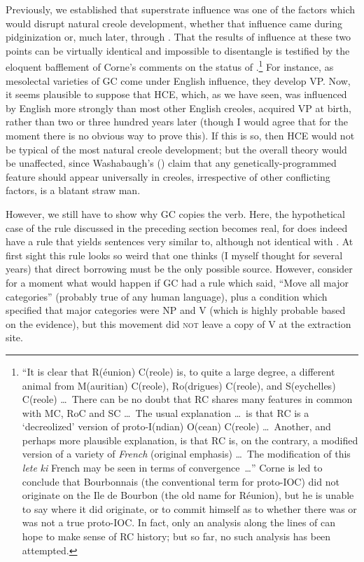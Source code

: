 Previously, we established that superstrate influence was one of the factors which would disrupt natural creole development, whether that influence came during pidginization or, much later, through
. That the results of influence at these two points can be virtually identical and impossible to disentangle is testified by the eloquent bafflement of Corne's comments on the status of  \citep[223--224]{Corne1977}.\footnote{``It is clear that R(éunion) C(reole) is, to quite a large degree, a different animal from M(auritian) C(reole), Ro(drigues) C(reole), and S(eychelles) C(reole) \ldots~There can be no doubt that RC shares many features in common with MC, RoC and SC \ldots~The usual explanation \ldots~is that RC is a `decreolized' version of proto-I(ndian) O(cean) C(reole) \ldots~Another, and perhaps more plausible explanation, is that RC is, on the contrary, a modified version of a variety of \textit{French} (original emphasis) \ldots~The modification of this \textit{lete} \textit{ki} French may be seen in terms of convergence~\ldots'' Corne is led to conclude that Bourbonnais (the conventional term for proto-IOC) did not originate on the Ile de Bourbon (the old name for Réunion), but he is unable to say where it did originate, or to commit himself as to whether there was or was not a true proto-IOC. In fact, only an analysis along the lines of \citet{Bickerton1975} can hope to make sense of RC history; but so far, no such analysis has been attempted.} For instance, as mesolectal varieties of GC come under English influence, they develop VP. Now, it seems plausible to suppose that HCE, which, as we have seen, was influenced by English more strongly than most other English creoles, acquired VP at birth, rather than two or three hundred years later (though I would agree that for the moment there is no obvious way to prove this). If this is so, then HCE would not be typical of the most natural creole development; but the overall theory would be unaffected, since Washabaugh's (\citeyear{Washabaugh1979}) claim that any genetically-programmed feature should appear universally in creoles, irrespective of other conflicting factors, is a blatant straw man.

However, we still have to show why GC copies the verb. Here, the hypothetical case of the  rule discussed in the preceding section becomes real, for  does indeed have a rule that yields sentences very similar to, although not identical with . At first sight this rule looks so weird that one thinks (I myself thought for several years) that direct borrowing must be the only possible source. However, consider for a moment what would happen if GC had a rule which said, ``Move all major categories'' (probably true of any human lan\-guage), plus a condition which specified that major categories were NP and V (which is highly probable based on the evidence), but this movement did \textsc{not} leave a copy of V at the extraction site.


